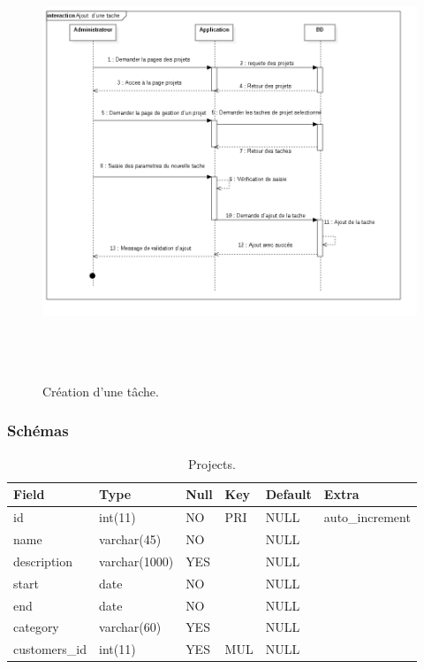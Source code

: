 \begin{figure}[H]
\center
\includegraphics[width=14cm,height=13cm]{./figures/seq/C.png}
\caption{Cr\'{e}ation d'une t\^{a}che.}
\end{figure}





\subsubsection{Sch\'{e}mas}
\FloatBarrier

\begin{table}

\begin{tabular}{|l|l|l|l|l|l|}
\hline
Field         & Type          & Null & Key & Default & Extra            \\
\hline
id            & int(11)       & NO   & PRI & NULL    & auto\_increment  \\
\hline
name          & varchar(45)   & NO   &     & NULL    &                  \\
\hline
description   & varchar(1000) & YES  &     & NULL    &                  \\
\hline
start         & date          & NO   &     & NULL    &                  \\
\hline
end           & date          & NO   &     & NULL    &                  \\
\hline
category      & varchar(60)   & YES  &     & NULL    &                  \\
\hline
customers\_id & int(11)       & YES  & MUL & NULL    &                  \\
\hline
\end{tabular}
\centering
 \caption {Projects.}
\end{table}
\FloatBarrier

